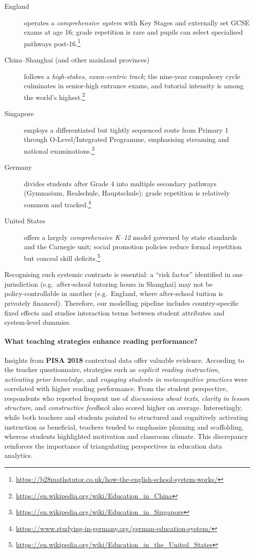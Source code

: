 \documentclass[final,5p,times,twocolumn,authoryear]{elsarticle}
\begin{document}
\begin{description}
  \item[England] operates a \emph{comprehensive system} with Key Stages and externally set GCSE exams at age 16; grade repetition is rare and pupils can select specialised pathways post‑16.\footnote{\url{https://b28mathstutor.co.uk/how-the-english-school-system-works/}}
  \item[China–Shanghai (and other mainland provinces)] follows a \emph{high‑stakes, exam‑centric track}; the nine‑year compulsory cycle culminates in senior‑high entrance exams, and tutorial intensity is among the world’s highest.\footnote{\url{https://en.wikipedia.org/wiki/Education_in_China}}
  \item[Singapore] employs a differentiated but tightly sequenced route from Primary 1 through O‑Level/Integrated Programme, emphasising streaming and national examinations.\footnote{\url{https://en.wikipedia.org/wiki/Education_in_Singapore}}
  \item[Germany] divides students after Grade 4 into multiple secondary pathways (Gymnasium, Realschule, Hauptschule); grade repetition is relatively common and tracked.\footnote{\url{https://www.studying-in-germany.org/german-education-system/}}
  \item[United States] offers a largely \emph{comprehensive K–12} model governed by state standards and the Carnegie unit; social promotion policies reduce formal repetition but conceal skill deficits.\footnote{\url{https://en.wikipedia.org/wiki/Education_in_the_United_States}}
\end{description}

Recognising such systemic contrasts is essential: a “risk factor” identified in one jurisdiction (e.g.\ after‑school tutoring hours in Shanghai) may not be policy‑controllable in another (e.g.\ England, where after‑school tuition is privately financed).  Therefore, our modelling pipeline includes country‑specific fixed effects and studies interaction terms between student attributes and system‑level dummies.

\paragraph{What teaching strategies enhance reading performance?}
Insights from \textbf{PISA 2018} contextual data offer valuable evidence. According to the teacher questionnaire, strategies such as \emph{explicit reading instruction}, \emph{activating prior knowledge}, and \emph{engaging students in metacognitive practices} were correlated with higher reading performance. From the student perspective, respondents who reported frequent use of \emph{discussions about texts}, \emph{clarity in lesson structure}, and \emph{constructive feedback} also scored higher on average. Interestingly, while both teachers and students pointed to structured and cognitively activating instruction as beneficial, teachers tended to emphasize planning and scaffolding, whereas students highlighted motivation and classroom climate. This discrepancy reinforces the importance of triangulating perspectives in education data analytics.
\end{document}
